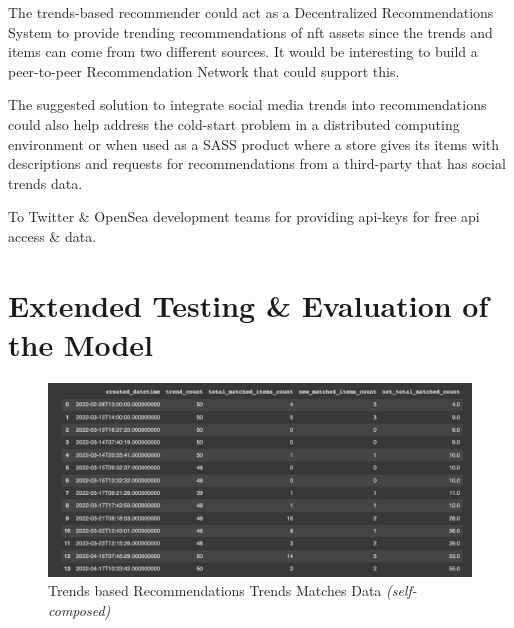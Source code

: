 \documentclass[manuscript,natbib=false]{acmart}
\begin{document}
The trends-based recommender could act as a Decentralized Recommendations System to provide trending recommendations of \gls{nft} assets since the trends and items can come from two different sources. It would be interesting to build a peer-to-peer Recommendation Network that could support this.

The suggested solution to integrate social media trends into recommendations could also help address the cold-start problem in a distributed computing environment or when used as a SASS product where a store gives its items with descriptions and requests for recommendations from a third-party that has social trends data.

\begin{acks}
To Twitter \& OpenSea development teams for providing \gls{api}-keys for free \gls{api} access \& data.
\end{acks}

% 
% 
\printbibliography


\appendix

\section{Extended Testing \& Evaluation of the Model}
\label{appendix:extended-testing-eval}

\begin{figure}[h]
\centering
\includegraphics[width=\linewidth]{images/trend-match-count-data.png}
\caption{Trends based Recommendations Trends Matches Data \textit{(self-composed)}}
\label{fig:trends-recsys-trends-matches-data}
\end{figure}
\end{document}
